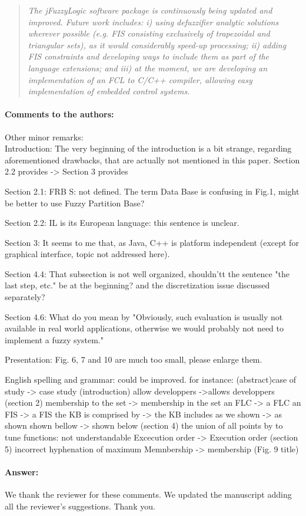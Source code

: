 \documentclass[10pt,a4paper]{article}
\begin{document}
\begin{quotation}\textit{
The jFuzzyLogic software package is continuously being updated and improved. 
Future work includes: 
	i) using defuzzifier analytic solutions wherever possible (e.g. FIS consisting exclusively of trapezoidal and triangular sets), as it would considerably speed-up processing; 
	ii) adding FIS constraints and developing ways to include them as part of the language extensions; and
	iii) at the moment, we are developing an implementation of an FCL to C/C++ compiler, allowing easy implementation of embedded control systems.
}\end{quotation}


\paragraph{Comments to the authors:} Other minor remarks: 
\\

Introduction: The very beginning of the introduction is a bit strange, regarding aforementioned drawbacks, that are actually not mentioned in this paper.
Section 2.2 provides -> Section 3 provides 

Section 2.1: FRB S: not defined. The term Data Base is confusing in Fig.1, might be better to use Fuzzy Partition Base? 

Section 2.2: IL is its European language: this sentence is unclear. 

Section 3: It seems to me that, as Java, C++ is platform independent (except for graphical interface, topic not addressed here). 

Section 4.4: That subsection is not well organized, shouldn'tt the sentence "the last step, etc." be at the beginning? and the discretization issue discussed separately? 

Section 4.6: What do you mean by "Obviously, such evaluation is usually not available in real world applications, otherwise we would probably not need to implement a fuzzy system." 

Presentation: Fig. 6, 7 and 10 are much too small, please enlarge them. 


English spelling and grammar: could be improved. for instance: (abstract)case of study -> case study (introduction) allow developpers ->allows developpers (section 2) membership to the set -> membership in the set an FLC -> a FLC an FIS -> a FIS the KB is comprised by -> the KB includes as we shown -> as shown shown bellow -> shown below 
(section 4) the union of all points by to tune functions: not understandable 
Excecution order -> Execution order 
(section 5) incorrect hyphenation of maximum Memnbership -> membership (Fig. 9 title) 

\paragraph{Answer:} We thank the reviewer for these comments. 
We updated the manuscript adding all the reviewer's suggestions.
Thank you.
\end{document}
